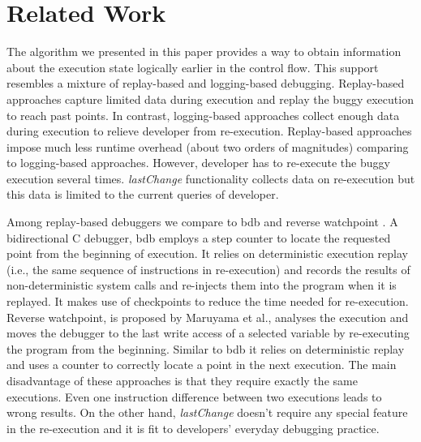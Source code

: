 \documentclass[runningheads,a4paper]{llncs}
\begin{document}

\section{Related Work}
\label{sec:relatedWork}

The algorithm we presented in this paper provides a way to obtain information about
the execution state logically earlier in the control flow. This
support resembles a mixture of replay-based and logging-based
debugging. Replay-based approaches capture limited data during
execution and replay the buggy execution to reach past points. In
contrast, logging-based approaches collect enough data during
execution to relieve developer from re-execution. Replay-based
approaches impose much less runtime overhead (about two orders of
magnitudes) comparing to logging-based approaches. However, developer
has to re-execute the buggy execution several
times. \textit{lastChange} functionality collects data on re-execution
but this data is limited to the current queries of developer.

Among replay-based debuggers we compare to bdb \cite{Boothe} and
reverse watchpoint \cite{Maruyama}.  A bidirectional C debugger, bdb
employs a step counter to locate the requested point from the
beginning of execution. It relies on deterministic execution replay
(i.e., the same sequence of instructions in re-execution) and records
the results of non-deterministic system calls and re-injects them into
the program when it is replayed. It makes use of checkpoints to reduce
the time needed for re-execution.  Reverse watchpoint, is proposed by
Maruyama et al., analyses the execution and moves the debugger to the
last write access of a selected variable by re-executing the program
from the beginning\cite{Maruyama}.  Similar to bdb it relies on deterministic
replay and uses a counter to correctly locate a point in the next
execution. The main disadvantage of these approaches is that they require 
exactly the same executions. Even one instruction difference between
two executions leads to wrong results. On the other hand,
\textit{lastChange} doesn't require any special feature in the
re-execution and it is fit to  developers' everyday debugging
practice.
\end{document}

